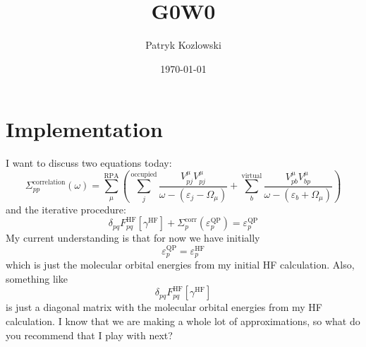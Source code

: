 \documentclass[12pt]{article}
\author{Patryk Kozlowski}
\title{G0W0}
\date{\today}
\begin{document}
\maketitle
\section{Implementation}
I want to discuss two equations today:
\begin{equation}
    \Sigma_{pp}^{\text{correlation}}(\omega) = \sum_{\mu }^{\text{RPA}}\left(\sum_{j}^{\text{occupied}} \frac{V_{pj}^{\mu }V_{pj}^{\mu }}{\omega -(\varepsilon _{j}-\Omega  _{\mu })}+ \sum_{b}^{\text{virtual}} \frac{V_{pb}^{\mu }V_{bp}^{\mu }}{\omega -(\varepsilon _{b}+\Omega  _{\mu })}\right)
\end{equation}
and the iterative procedure:
\begin{equation}
    \delta_{pq}F_{pq}^{\text{HF}}[\gamma^{\text{HF}}] + \Sigma_{p}^{\text{corr}}(\varepsilon_{p}^{\text{QP}}) = \varepsilon_{p}^{\text{QP}}
\end{equation}
My current understanding is that for now we have initially
\begin{equation}
    \varepsilon_{p}^{\text{QP}} = \varepsilon_{p}^{\text{HF}}
\end{equation}
which is just the molecular orbital energies from my initial HF calculation. Also, something like
\begin{equation}
    \delta_{pq}F_{pq}^{\text{HF}}[\gamma^{\text{HF}}]
\end{equation}
is just a diagonal matrix with the molecular orbital energies from my HF calculation. I know that we are making a whole lot of approximations, so what do you recommend that I play with next?
\end{document}
